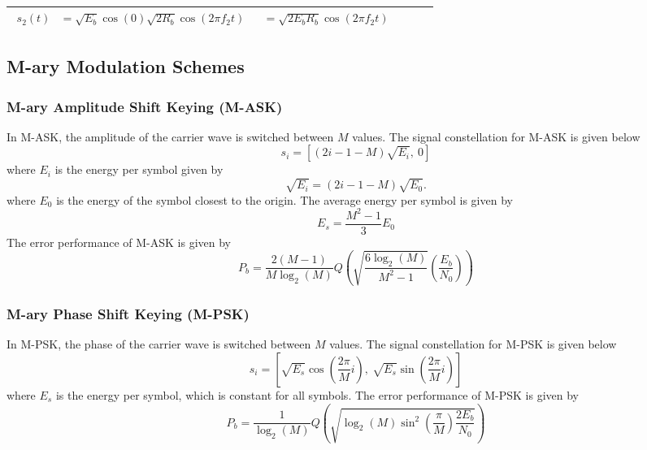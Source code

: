 \documentclass{article}
\begin{document}
\begin{table}[H]
\begin{tabular}{cccc}
{\begin{align*}
                                                                                                      s_2\left( t \right) & = \sqrt{E_b} \cos{\left( 0 \right)} \sqrt{2R_b} \cos{\left( 2 \pi f_2 t \right)} && = \sqrt{2 E_b R_b} \cos{\left( 2 \pi f_2 t \right)}
                                                                                                   \end{align*}} \\
        \bottomrule
    \end{tabular}
\end{table}
\subsection{M-ary Modulation Schemes}
\subsubsection{M-ary Amplitude Shift Keying (M-ASK)}
In M-ASK, the amplitude of the carrier wave is switched between \(M\)
values. The signal constellation for M-ASK is given below
\begin{equation*}
    s_i = \left[ \left( 2i - 1 - M \right) \sqrt{E_i},\: 0 \right]
\end{equation*}
where \(E_i\) is the energy per symbol given by
\begin{equation*}
    \sqrt{E_i} = \left( 2i - 1 - M \right) \sqrt{E_0}.
\end{equation*}
where \(E_0\) is the energy of the symbol closest to the origin.
The average energy per symbol is given by
\begin{equation*}
    E_s = \frac{M^2 - 1}{3} E_0
\end{equation*}
The error performance of M-ASK is given by
\begin{equation*}
    P_b = \frac{2\left( M - 1 \right)}{M \log_2{\left( M \right)}} Q\left( \sqrt{\frac{6 \log_2{\left( M \right)}}{M^2 - 1}} \left( \frac{E_b}{N_0} \right) \right)
\end{equation*}
\subsubsection{M-ary Phase Shift Keying (M-PSK)}
In M-PSK, the phase of the carrier wave is switched between \(M\)
values. The signal constellation for M-PSK is given below
\begin{equation*}
    s_i = \left[ \sqrt{E_s} \cos{\left( \frac{2\pi}{M} i \right)},\: \sqrt{E_s} \sin{\left( \frac{2\pi}{M} i \right)} \right]
\end{equation*}
where \(E_s\) is the energy per symbol, which is constant for all
symbols. The error performance of M-PSK is given by
\begin{equation*}
    P_b = \frac{1}{\log_2{\left( M \right)}} Q\left( \sqrt{\log_2{\left( M \right)} \sin^2{\left( \frac{\pi}{M} \right)} \frac{2 E_b}{N_0}} \right)
\end{equation*}
\end{document}
